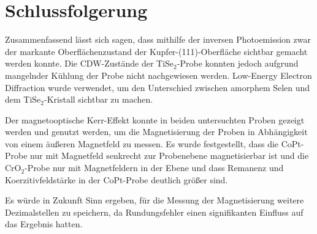 \newpage
\section{Schlussfolgerung}

  Zusammenfassend lässt sich sagen, dass mithilfe der inversen Photoemission zwar der markante Oberflächenzustand der Kupfer-(111)-Oberfläche sichtbar gemacht werden konnte.
  Die CDW-Zustände der TiSe$_2$-Probe konnten jedoch aufgrund mangelnder Kühlung der Probe nicht nachgewiesen werden.
  Low-Energy Electron Diffraction wurde verwendet, um den Unterschied zwischen amorphem Selen und dem TiSe$_2$-Kristall sichtbar zu machen.

  Der magnetooptische Kerr-Effekt konnte in beiden untersuchten Proben gezeigt werden und genutzt werden, um die Magnetisierung der Proben in Abhängigkeit von einem äußeren Magnetfeld zu messen.
  Es wurde festgestellt, dass die CoPt-Probe nur mit Magnetfeld senkrecht zur Probenebene magnetisierbar ist und die CrO$_2$-Probe nur mit Magnetfeldern in der Ebene und dass Remanenz und Koerzitivfeldstärke in der CoPt-Probe deutlich größer sind.

  Es würde in Zukunft Sinn ergeben, für die Messung der Magnetisierung weitere Dezimalstellen zu speichern, da Rundungsfehler einen signifikanten Einfluss auf das Ergebnis hatten.
